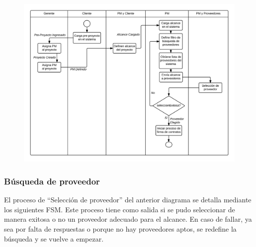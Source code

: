 \begin{figure}[H]
\includegraphics[width=\linewidth]{diag/nuevos/act-busqprov.png}
\label{act-busqprov}
\end{figure}

		\subsubsection{Búsqueda de proveedor}
El proceso de ``Selección de proveedor'' del anterior diagrama se detalla mediante 
los siguientes FSM. Este proceso tiene como salida si se pudo seleccionar de 
manera exitosa o no un proveedor adecuado para el alcance. En caso de fallar, ya sea 
por falta de respuestas o porque no hay proveedores aptos, se redefine la búsqueda y 
se vuelve a empezar. 

